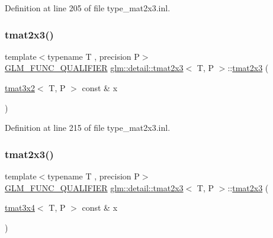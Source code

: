 Definition at line 205 of file type\+\_\+mat2x3.\+inl.

\mbox{\label{structglm_1_1detail_1_1tmat2x3_acdd851e9160ca0515af9eef17a698d36}} 
\subsubsection{\texorpdfstring{tmat2x3()}{tmat2x3()}\hspace{0.1cm}{\footnotesize\ttfamily [15/22]}}
{\footnotesize\ttfamily template$<$typename T , precision P$>$ \\
\hyperlink{setup_8hpp_a33fdea6f91c5f834105f7415e2a64407}{G\+L\+M\+\_\+\+F\+U\+N\+C\+\_\+\+Q\+U\+A\+L\+I\+F\+I\+ER} \hyperlink{structglm_1_1detail_1_1tmat2x3}{glm\+::detail\+::tmat2x3}$<$ T, P $>$\+::\hyperlink{structglm_1_1detail_1_1tmat2x3}{tmat2x3} (\begin{DoxyParamCaption}\item[{\hyperlink{structglm_1_1detail_1_1tmat3x2}{tmat3x2}$<$ T, P $>$ const \&}]{x }\end{DoxyParamCaption})\hspace{0.3cm}{\ttfamily [explicit]}}



Definition at line 215 of file type\+\_\+mat2x3.\+inl.

\mbox{\label{structglm_1_1detail_1_1tmat2x3_a715213bd6e4ad7b7c4757590821b7ef2}} 
\subsubsection{\texorpdfstring{tmat2x3()}{tmat2x3()}\hspace{0.1cm}{\footnotesize\ttfamily [16/22]}}
{\footnotesize\ttfamily template$<$typename T , precision P$>$ \\
\hyperlink{setup_8hpp_a33fdea6f91c5f834105f7415e2a64407}{G\+L\+M\+\_\+\+F\+U\+N\+C\+\_\+\+Q\+U\+A\+L\+I\+F\+I\+ER} \hyperlink{structglm_1_1detail_1_1tmat2x3}{glm\+::detail\+::tmat2x3}$<$ T, P $>$\+::\hyperlink{structglm_1_1detail_1_1tmat2x3}{tmat2x3} (\begin{DoxyParamCaption}\item[{\hyperlink{structglm_1_1detail_1_1tmat3x4}{tmat3x4}$<$ T, P $>$ const \&}]{x }\end{DoxyParamCaption})\hspace{0.3cm}{\ttfamily [explicit]}}



